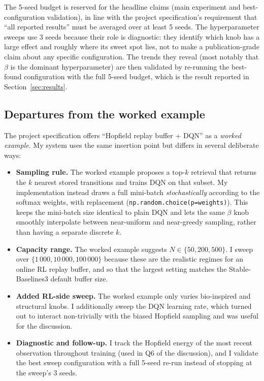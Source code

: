 \documentclass[a4paper,11pt]{article}
\begin{document}
The 5-seed budget is reserved for the headline claims (main experiment
and best-configuration validation), in line with the project
specification's requirement that ``all reported results'' must be averaged
over at least 5 seeds. The hyperparameter sweeps use 3 seeds because
their role is diagnostic: they identify which knob has a large effect
and roughly where its sweet spot lies, not to make a publication-grade
claim about any specific configuration. The trends they reveal (most
notably that $\beta$ is the dominant hyperparameter) are then validated
by re-running the best-found configuration with the full 5-seed budget,
which is the result reported in Section~\ref{sec:results}.

\subsection{Departures from the worked example}

The project specification offers ``Hopfield replay buffer + DQN'' as a
\emph{worked example}. My system uses the same insertion point but
differs in several deliberate ways:

\begin{itemize}
    \item \textbf{Sampling rule.} The worked example proposes a
    $\text{top-}k$ retrieval that returns the $k$ nearest stored
    transitions and trains DQN on that subset. My implementation
    instead draws a full mini-batch \emph{stochastically} according to
    the softmax weights, with replacement
    (\texttt{np.random.choice(p=weights)}). This keeps the mini-batch
    size identical to plain DQN and lets the same $\beta$ knob
    smoothly interpolate between near-uniform and near-greedy sampling,
    rather than having a separate discrete $k$.
    \item \textbf{Capacity range.} The worked example suggests
    $N \in \{50, 200, 500\}$. I sweep over $\{1\,000, 10\,000, 100\,000\}$
    because these are the realistic regimes for an online RL replay
    buffer, and so that the largest setting matches the
    Stable-Baselines3 default buffer size.
    \item \textbf{Added RL-side sweep.} The worked example only varies
    bio-inspired and structural knobs. I additionally sweep the DQN
    learning rate, which turned out to interact non-trivially with the
    biased Hopfield sampling and was useful for the discussion.
    \item \textbf{Diagnostic and follow-up.} I track the Hopfield
    energy of the most recent observation throughout training (used in
    Q6 of the discussion), and I validate the best sweep configuration
    with a full 5-seed re-run instead of stopping at the sweep's 3
    seeds.
\end{itemize}
\end{document}
